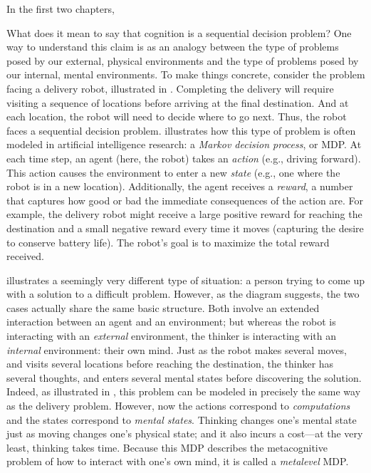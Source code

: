 \documentclass[12pt,a4paperpaper,]{article}
\begin{document}
In the first two chapters,

What does it mean to say that cognition is a sequential decision problem? One way to understand this claim is as an analogy between the type of problems posed by our external, physical environments and the type of problems posed by our internal, mental environments. To make things concrete, consider the problem facing a delivery robot, illustrated in . Completing the delivery will require visiting a sequence of locations before arriving at the final destination. And at each location, the robot will need to decide where to go next. Thus, the robot faces a sequential decision problem.  illustrates how this type of problem is often modeled in artificial intelligence research: a \emph{Markov decision process}, or MDP. At each time step, an agent (here, the robot) takes an \emph{action} (e.g., driving forward). This action causes the environment to enter a new \emph{state} (e.g., one where the robot is in a new location). Additionally, the agent receives a \emph{reward}, a number that captures how good or bad the immediate consequences of the action are. For example, the delivery robot might receive a large positive reward for reaching the destination and a small negative reward every time it moves (capturing the desire to conserve battery life). The robot's goal is to maximize the total reward received.

 illustrates a seemingly very different type of situation: a person trying to come up with a solution to a difficult problem. However, as the diagram suggests, the two cases actually share the same basic structure. Both involve an extended interaction between an agent and an environment; but whereas the robot is interacting with an \emph{external} environment, the thinker is interacting with an \emph{internal} environment: their own mind. Just as the robot makes several moves, and visits several locations before reaching the destination, the thinker has several thoughts, and enters several mental states before discovering the solution. Indeed, as illustrated in , this problem can be modeled in precisely the same way as the delivery problem. However, now the actions correspond to \emph{computations} and the states correspond to \emph{mental states}. Thinking changes one's mental state just as moving changes one's physical state; and it also incurs a cost---at the very least, thinking takes time. Because this MDP describes the metacognitive problem of how to interact with one's own mind, it is called a \emph{metalevel} MDP.
\end{document}
